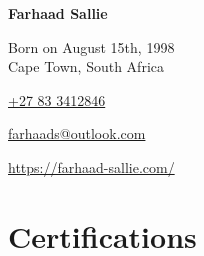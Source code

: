 \documentclass[10pt,a4paper,ragged2e,withhyper]{altacv}
\newcommand{\MySkip} {
		\vskip 
		12pt
	}
\newcommand{\myhref}[2]{
		\href{#1}
		{\textcolor{ColorTwo}{#2}}
	}
\begin{document}
    \thispagestyle{empty}
    \begin{adjustbox}{valign=t} 
    \begin{minipage}{0.3\textwidth}
        \begin{center}
            \MySkip
            {\LARGE \bfseries Farhaad Sallie}
            \MySkip 
            Born on August 15th, 1998\\
            Cape Town, South Africa\\ 
            \MySkip 	%
            \textcolor{ColorTwo}{\faMobile} 
            \myhref{tel:+27833412846}
            {+27 83 3412846} \\
            \textcolor{ColorTwo}{\faEnvelopeO} 
            \myhref{mailto:farhaads@outlook.com}
            {farhaads@outlook.com} \\
            \textcolor{ColorTwo}{\faChain} 
            \myhref{https://www.farhaad-sallie.com/}{https://farhaad-sallie.com/} \\
             \myhref{mailto:farhaads@outlook.com}{}     
            \myhref{https://www.linkedin.com/in/farhaad-sallie/}{\faicon{linkedin}} 
        \end{center}
        \vfill
        \vspace{-10mm}\section*{Certifications}
            

\end{minipage}
\end{adjustbox}
\end{document}
